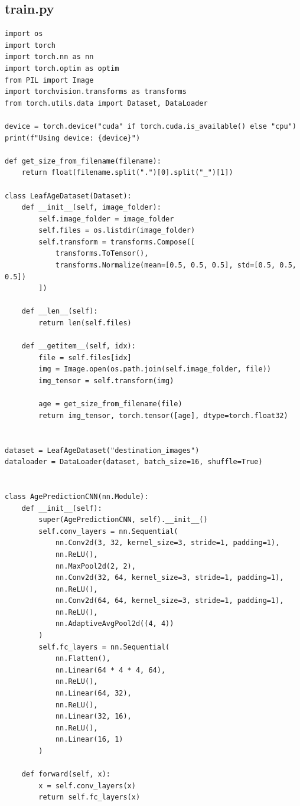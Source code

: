 \subsection{train.py}
\begin{verbatim}
import os
import torch
import torch.nn as nn
import torch.optim as optim
from PIL import Image
import torchvision.transforms as transforms
from torch.utils.data import Dataset, DataLoader

device = torch.device("cuda" if torch.cuda.is_available() else "cpu")
print(f"Using device: {device}")

def get_size_from_filename(filename):
    return float(filename.split(".")[0].split("_")[1])

class LeafAgeDataset(Dataset):
    def __init__(self, image_folder):
        self.image_folder = image_folder
        self.files = os.listdir(image_folder)
        self.transform = transforms.Compose([
            transforms.ToTensor(),
            transforms.Normalize(mean=[0.5, 0.5, 0.5], std=[0.5, 0.5, 0.5])
        ])

    def __len__(self):
        return len(self.files)

    def __getitem__(self, idx):
        file = self.files[idx]
        img = Image.open(os.path.join(self.image_folder, file))
        img_tensor = self.transform(img)

        age = get_size_from_filename(file)
        return img_tensor, torch.tensor([age], dtype=torch.float32)


dataset = LeafAgeDataset("destination_images")
dataloader = DataLoader(dataset, batch_size=16, shuffle=True)


class AgePredictionCNN(nn.Module):
    def __init__(self):
        super(AgePredictionCNN, self).__init__()
        self.conv_layers = nn.Sequential(
            nn.Conv2d(3, 32, kernel_size=3, stride=1, padding=1),
            nn.ReLU(),
            nn.MaxPool2d(2, 2),
            nn.Conv2d(32, 64, kernel_size=3, stride=1, padding=1),
            nn.ReLU(),
            nn.Conv2d(64, 64, kernel_size=3, stride=1, padding=1),
            nn.ReLU(),
            nn.AdaptiveAvgPool2d((4, 4))
        )
        self.fc_layers = nn.Sequential(
            nn.Flatten(),
            nn.Linear(64 * 4 * 4, 64),
            nn.ReLU(),
            nn.Linear(64, 32),
            nn.ReLU(),
            nn.Linear(32, 16),
            nn.ReLU(),
            nn.Linear(16, 1)
        )

    def forward(self, x):
        x = self.conv_layers(x)
        return self.fc_layers(x)


\end{verbatim}
